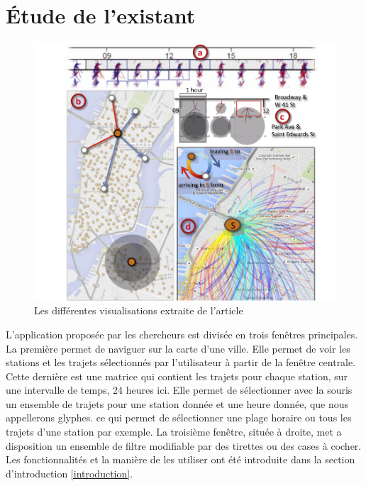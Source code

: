 \documentclass[12pt]{article}
\begin{document}
	\section{Étude de l’existant}	\label{etude_de_lexistant}
	\begin{figure}[!h]
	\begin{center}
	\includegraphics[scale=.3]{screenshot_article.png}
	\caption{Les différentes visualisations extraite de l'article \cite{Oli16}}
	\end{center}
	\end{figure}
	
	L’application proposée par les chercheurs est divisée en trois fenêtres principales.
	La première permet de naviguer sur la carte d’une ville. Elle permet de voir les
	stations et les trajets sélectionnés par l’utilisateur à partir de la fenêtre centrale.
	Cette dernière est une matrice qui contient les trajets pour chaque station, sur une
	intervalle de temps, 24 heures ici. Elle permet de sélectionner avec la souris un
	ensemble de trajets pour une station donnée et une heure donnée, que nous appellerons glyphes.
	ce qui permet de sélectionner une plage horaire ou tous les trajets d'une station par exemple.
	La troisième fenêtre, située à droite, met a disposition un ensemble de filtre modifiable
	par des tirettes ou des cases à cocher. \\
	
	Les fonctionnalités et la manière de les utiliser ont été introduite dans la section
	d'introduction \ref{introduction}.\\
\end{document}
